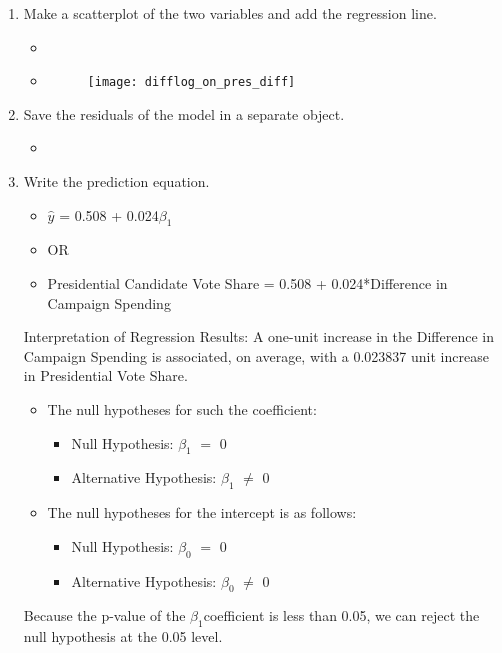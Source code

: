 \documentclass[12pt,letterpaper]{article}
\begin{document}
\begin{enumerate}
		\item Make a scatterplot of the two variables and add the regression line. 
	

\begin{itemize}
	\item 
	\item 	\begin{figure}[h]
		\centering
		\texttt{[image: difflog\_on\_pres\_diff]}
	\end{figure} 
\end{itemize}


		\item Save the residuals of the model in a separate object.	

\begin{itemize}
	\item 
\end{itemize}


		\item Write the prediction equation.
		
\begin{itemize}
	\item $\hat{y}$ = 0.508 + 0.024$\beta_1$
	\item OR
	\item Presidential Candidate Vote Share =  0.508 + 0.024*Difference in Campaign Spending
\end{itemize}

\begin{flushleft}Interpretation of Regression Results: A one-unit increase in the Difference in Campaign Spending is associated, on average, with a  0.023837 unit increase in Presidential Vote Share.
	\end{flushleft}

\begin{itemize}
	\item  The null hypotheses for such the coefficient:
	\begin{itemize}
		\item {Null Hypothesis: $\beta_1$ $=$ 0}
		\item {Alternative Hypothesis: $\beta_1$ $\neq$ 0}
	\end{itemize}
	
	\item The null hypotheses for the intercept is as follows:
	\begin{itemize}
		\item {Null Hypothesis: $\beta_0$ $=$ 0}
		\item {Alternative Hypothesis: $\beta_0$ $\neq$ 0}
	\end{itemize}
	
\end{itemize}

\begin{flushleft}Because the p-value of the $\beta_1$coefficient is less than 0.05, we can reject the null hypothesis at the 0.05 level.
	\end{flushleft}

	\end{enumerate}
\end{document}
